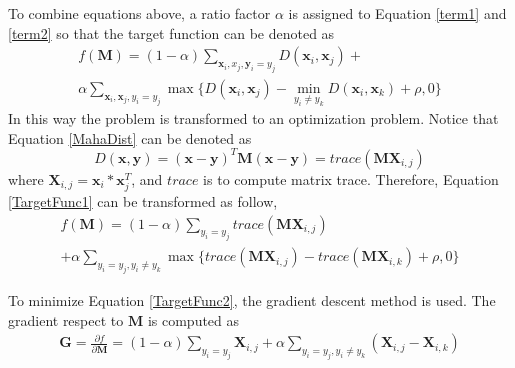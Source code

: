  
 To combine equations above, a ratio factor $\alpha$ is assigned to Equation \eqref{term1} and \eqref{term2} so that the target function can be denoted as 
  \begin{equation}
  \label{TargetFunc1}
  \begin{aligned}
 f(\bm{M}) = (1-\alpha)\sum_{\bm{x}_i,x_j,\bm{y}_i=y_j} D(\bm{x}_i,\bm{x}_j) + \\
  \alpha \sum_{\bm{x}_i,\bm{x}_j,y_i=y_j}\max\{{D(\bm{x}_i,\bm{x}_j)-\min_{y_i\ne y_k}{D(\bm{x}_i,\bm{x}_k)}+\rho,0}\}
 \end{aligned}
 \end{equation}
 In this way the problem is transformed to an optimization problem. Notice that Equation \ref{MahaDist} can be denoted as 
 \begin{equation}
 D(\bm{x},\bm{y}) = (\bm{x} - \bm{y})^T\bm{M}(\bm{x} - \bm{y}) = trace(\bm{M}\bm{X}_{i,j})
 \end{equation}
 where $\bm{X}_{i,j} = \bm{x}_i*\bm{x}_j^T$, and $trace$ is to compute matrix trace. Therefore, Equation \ref{TargetFunc1} can be transformed as follow,
 \begin{equation}
 \label{TargetFunc2}
 \begin{aligned}
 f(\bm{M}) = (1-\alpha)\sum_{y_i = y_j}trace(\bm{M}\bm{X}_{i,j}) \\
  + \alpha \sum_{y_i = y_j,y_i\ne y_k}\max\{trace(\bm{M}\bm{X}_{i,j}) - trace(\bm{M}\bm{X}_{i,k} )+ \rho,0\}
 \end{aligned}
 \end{equation}
 
 To minimize Equation \ref{TargetFunc2}, the gradient descent method is used. The gradient respect to $\bm{M}$ is computed as
 \begin{equation}
 \begin{aligned}
\bm{G} =  \frac{\partial f}{\partial \bm{M}} = (1-\alpha) \sum_{y_i = y_j} \bm{X}_{i,j} 
 + \alpha \sum_{y_i = y_j, y_i \ne y_k}(\bm{X}_{i,j} - \bm{X}_{i,k})
 \end{aligned}
 \end{equation}
 
